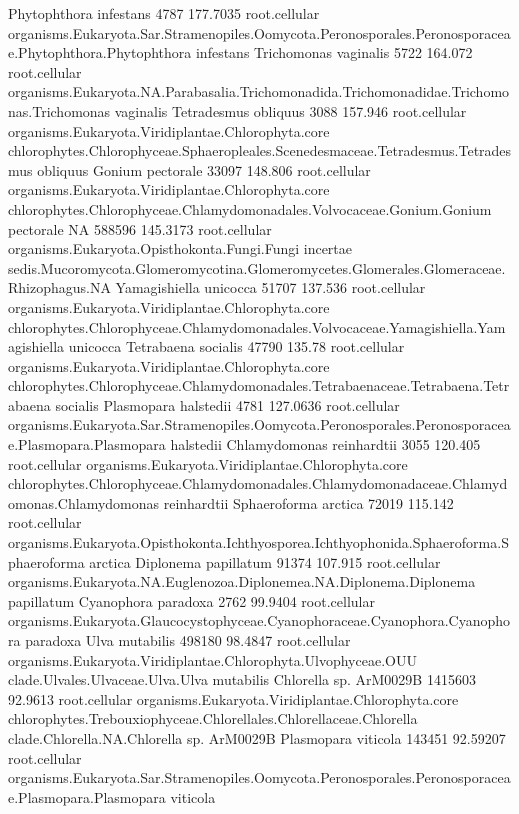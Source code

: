 \documentclass{article}
\begin{document}
\begin{Schunk}
\begin{Soutput}
 Phytophthora infestans 		 4787 177.7035 	 root.cellular organisms.Eukaryota.Sar.Stramenopiles.Oomycota.Peronosporales.Peronosporaceae.Phytophthora.Phytophthora infestans
 Trichomonas vaginalis 		 5722 164.072 	 root.cellular organisms.Eukaryota.NA.Parabasalia.Trichomonadida.Trichomonadidae.Trichomonas.Trichomonas vaginalis
 Tetradesmus obliquus 		 3088 157.946 	 root.cellular organisms.Eukaryota.Viridiplantae.Chlorophyta.core chlorophytes.Chlorophyceae.Sphaeropleales.Scenedesmaceae.Tetradesmus.Tetradesmus obliquus
 Gonium pectorale 		 33097 148.806 	 root.cellular organisms.Eukaryota.Viridiplantae.Chlorophyta.core chlorophytes.Chlorophyceae.Chlamydomonadales.Volvocaceae.Gonium.Gonium pectorale
 NA 		 588596 145.3173 	 root.cellular organisms.Eukaryota.Opisthokonta.Fungi.Fungi incertae sedis.Mucoromycota.Glomeromycotina.Glomeromycetes.Glomerales.Glomeraceae.Rhizophagus.NA
 Yamagishiella unicocca 		 51707 137.536 	 root.cellular organisms.Eukaryota.Viridiplantae.Chlorophyta.core chlorophytes.Chlorophyceae.Chlamydomonadales.Volvocaceae.Yamagishiella.Yamagishiella unicocca
 Tetrabaena socialis 		 47790 135.78 	 root.cellular organisms.Eukaryota.Viridiplantae.Chlorophyta.core chlorophytes.Chlorophyceae.Chlamydomonadales.Tetrabaenaceae.Tetrabaena.Tetrabaena socialis
 Plasmopara halstedii 		 4781 127.0636 	 root.cellular organisms.Eukaryota.Sar.Stramenopiles.Oomycota.Peronosporales.Peronosporaceae.Plasmopara.Plasmopara halstedii
 Chlamydomonas reinhardtii 		 3055 120.405 	 root.cellular organisms.Eukaryota.Viridiplantae.Chlorophyta.core chlorophytes.Chlorophyceae.Chlamydomonadales.Chlamydomonadaceae.Chlamydomonas.Chlamydomonas reinhardtii
 Sphaeroforma arctica 		 72019 115.142 	 root.cellular organisms.Eukaryota.Opisthokonta.Ichthyosporea.Ichthyophonida.Sphaeroforma.Sphaeroforma arctica
 Diplonema papillatum 		 91374 107.915 	 root.cellular organisms.Eukaryota.NA.Euglenozoa.Diplonemea.NA.Diplonema.Diplonema papillatum
 Cyanophora paradoxa 		 2762 99.9404 	 root.cellular organisms.Eukaryota.Glaucocystophyceae.Cyanophoraceae.Cyanophora.Cyanophora paradoxa
 Ulva mutabilis 		 498180 98.4847 	 root.cellular organisms.Eukaryota.Viridiplantae.Chlorophyta.Ulvophyceae.OUU clade.Ulvales.Ulvaceae.Ulva.Ulva mutabilis
 Chlorella sp. ArM0029B 		 1415603 92.9613 	 root.cellular organisms.Eukaryota.Viridiplantae.Chlorophyta.core chlorophytes.Trebouxiophyceae.Chlorellales.Chlorellaceae.Chlorella clade.Chlorella.NA.Chlorella sp. ArM0029B
 Plasmopara viticola 		 143451 92.59207 	 root.cellular organisms.Eukaryota.Sar.Stramenopiles.Oomycota.Peronosporales.Peronosporaceae.Plasmopara.Plasmopara viticola

\end{Soutput}
\end{Schunk}
\end{document}
